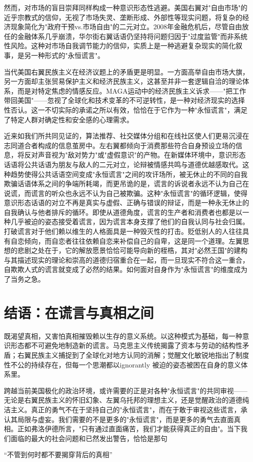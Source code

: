 \documentclass{article}
\begin{document}
然而，对市场的盲目崇拜同样构成一种意识形态性逃避。美国右翼对"自由市场"的近乎宗教式的信仰，无视了市场失灵、垄断形成、外部性等现实问题，将复杂的经济现象简化为"政府干预vs.市场自由"的二元对立。2008年金融危机后，尽管自由放任的金融体系几乎崩溃，华尔街右翼话语仍坚持将问题归因于"过度监管"而非系统性风险。这种对市场自我调节能力的信仰，实质上是一种逃避复杂现实的简化叙事，是另一种形式的"永恒谎言"。

当代美国右翼民族主义在经济议题上的矛盾更是明显。一方面高举自由市场大旗，另一方面却主张贸易保护主义和经济民族主义，这甚至并非一套逻辑自洽的理论体系，而是对特定焦虑的情感反应。MAGA运动中的经济民族主义诉求——"把工作带回美国"——忽视了全球化和技术变革的不可逆转性，是一种对经济现实的选择性否认。这一不切实际的承诺之所以有效，恰恰在于它作为一种"永恒谎言"，满足了特定人群对确定性和安全感的心理需求。

近来如我们所共同见证的，算法推荐、社交媒体分组和在线社区使人们更易沉浸在志同道合者构成的信息茧房中。左右翼都倾向于消费那些符合自身预设立场的信息，将反对声音视为"敌对势力"或"虚假意识"的产物。在新媒体环境中，意识形态话语将公共话语为朋友与敌人的二元对立，论辩被情感共鸣与道德优越感取代。这种趋势使得公共话语空间变成"永恒谎言"之间的攻讦场所，被无休止的不同的自我欺骗话语体系之间的争端所耗竭，而更吊诡的是，谎言的诉说者永远不认为自己在说谎，而谎言的听众也永远不认为自己被欺骗。这种"永恒谎言"的循环逻辑，使得意识形态话语的对立不再是真实与虚假、正确与错误的辩证，而是一种永无休止的自我确认与他者排斥的循环。即使从道德角度，谎言的生产者和消费者也都是以一种几乎被迫的姿态接受着谎言，因为谎言本身支撑了他们的自我认同与社会归属。打破谎言对于他们赖以维生的人格面具是一种毁灭性的打击。贬低别人的人往往具有自恋倾向，而自恋者往往依赖自恋来补偿自己的自卑，这是同一个道理。左翼思想的悲剧之处在于，它的解放愿景恰恰可能导向新的桎梏，其对"必然王国"的建构与其描述现实的理论和崇高的道德归宿重合在一起，而一旦现实不符合这一重合，自欺欺人式的谎言就变成了必然的结果。如何面对自身作为"永恒谎言"的维度成为了当务之急。

\section{结语：在谎言与真相之间}

既渴望真相，又害怕真相摧毁赖以生存的意义系统。以这种模式为基础，每一种意识形态都不可避免地制造新的谎言。马克思主义传统揭露了资本与劳动的结构性矛盾；右翼民族主义捕捉到了全球化对地方认同的消解；觉醒文化敏锐地指出了制度性不公的持续存在，但每一个思潮都以ignorantly 被迫的姿态被困在自身的意义体系里。

跨越当前美国极化的政治环境，或许需要的正是对各种"永恒谎言"的共同审视——无论是右翼民族主义的怀旧幻象、左翼乌托邦的理想主义，还是觉醒政治的道德纯洁主义。真正的勇气不在于坚持自己的"永恒谎言"，而在于敢于审视这些谎言，承认其局限与虚妄。我们需要的不是更多的"永恒谎言"，而是更多的勇气去直面真相。正如弗洛伊德所言，"只有通过直面痛苦，我们才能获得真正的自由"。当下我们面临的最大的社会问题和已然发出警告，恰恰是那句

“不管到何时都不要揭穿背后的真相”
\end{document}
